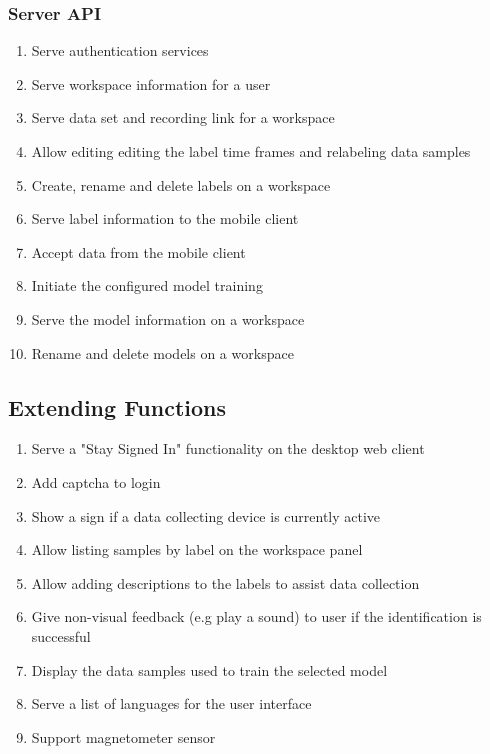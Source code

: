 \subsubsection{Server API}
\begin{enumerate}[resume*]
    \item Serve authentication services
    \item Serve workspace information for a user
    \item Serve data set and recording link for a workspace
    \item Allow editing editing the label time frames and relabeling data samples
    \item Create, rename and delete labels on a workspace
    \item Serve label information to the mobile client
    \item Accept data from the mobile client
    \item Initiate the configured model training
    \item Serve the model information on a workspace
    \item Rename and delete models on a workspace
\end{enumerate}

\subsection{Extending Functions}
\begin{enumerate}[resume*]
    \item Serve a "Stay Signed In" functionality on the desktop web client
    \item Add captcha to login
    \item Show a sign if a data collecting device is currently active
    \item Allow listing samples by label on the workspace panel
    \item Allow adding descriptions to the labels to assist data collection
    \item \label{/F480/} Give non-visual feedback (e.g play a sound) to user if the identification is successful
    \item Display the data samples used to train the selected model
    \item Serve a list of languages for the user interface
    \item Support magnetometer sensor
\end{enumerate}